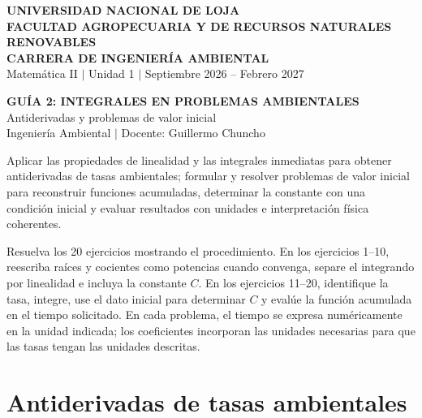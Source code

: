 \documentclass[11pt,a4paper]{article}
\begin{document}
\thispagestyle{plain}

\begin{center}
  {\Large\textbf{\color{azulOscuroUNL}UNIVERSIDAD NACIONAL DE LOJA}}\\[2pt]
  {\normalsize\textbf{FACULTAD AGROPECUARIA Y DE RECURSOS NATURALES RENOVABLES}}\\[2pt]
  {\normalsize\textbf{CARRERA DE INGENIERÍA AMBIENTAL}}\\[4pt]
  {\small Matemática II $\vert$ Unidad 1 $\vert$ Septiembre 2026 -- Febrero 2027}
\end{center}

\vspace{0.15cm}
\begin{bannerbox}
  \centering\color{white}
  {\Large\bfseries GUÍA 2: INTEGRALES EN PROBLEMAS AMBIENTALES}\\[3pt]
  {\normalsize Antiderivadas y problemas de valor inicial}\\[3pt]
  {\small Ingeniería Ambiental $\vert$ Docente: Guillermo Chuncho}
\end{bannerbox}

\begin{goalbox}[title=Objetivo de los ejercicios]
Aplicar las propiedades de linealidad y las integrales inmediatas para obtener antiderivadas de tasas ambientales; formular y resolver problemas de valor inicial para reconstruir funciones acumuladas, determinar la constante con una condición inicial y evaluar resultados con unidades e interpretación física coherentes.
\end{goalbox}

\begin{conceptbox}[title=Indicaciones de trabajo]
Resuelva los 20 ejercicios mostrando el procedimiento. En los ejercicios 1--10, reescriba raíces y cocientes como potencias cuando convenga, separe el integrando por linealidad e incluya la constante $C$. En los ejercicios 11--20, identifique la tasa, integre, use el dato inicial para determinar $C$ y evalúe la función acumulada en el tiempo solicitado. En cada problema, el tiempo se expresa numéricamente en la unidad indicada; los coeficientes incorporan las unidades necesarias para que las tasas tengan las unidades descritas.
\end{conceptbox}

\section{Antiderivadas de tasas ambientales}
\end{document}
